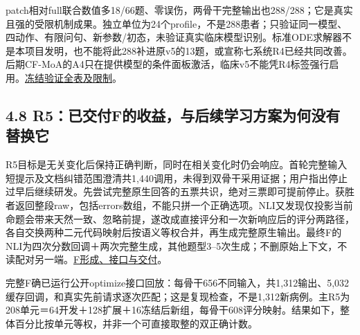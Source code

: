 \documentclass[
  11pt,
  a4paper,
]{article}
\begin{document}
patch相对full联合数值多18/66题、零误伤，两骨干完整输出也288/288；它是真实且强的受限机制成果。独立单位为24个profile，不是288患者；只验证同一模型、四动作、有限问句、新参数/初态，未验证真实临床模型识别。标准ODE求解器不是本项目发明，也不能将此288补进原v5的13题，或宣称七系统R4已经共同改善。后期CF-MoA的A4只在提供模型的条件面板激活，临床v5不能凭R4标签强行启用。\href{https://github.com/xiotakut/cf_mrg/blob/main/papers/2026-10-02_cf_moa/author_dossier/records/research/r4_consequence_head.md\#L579}{冻结验证全表及限制}。

\subsection{4.8
R5：已交付F的收益，与后续学习方案为何没有替换它}\label{r5ux5df2ux4ea4ux4ed8fux7684ux6536ux76caux4e0eux540eux7eedux5b66ux4e60ux65b9ux6848ux4e3aux4f55ux6ca1ux6709ux66ffux6362ux5b83}

R5目标是无关变化后保持正确判断，同时在相关变化时仍会响应。首轮完整输入短提示及文档纠错范围澄清共1,440调用，未得到双骨干采用证据；用户指出停止过早后继续研发。先尝试完整原生回答的五票共识，绝对三票即可提前停止。获胜者返回整段raw，包括errors数组，不能只拼一个正确选项。NLI又发现仅投影当前命题会带来天然一致、忽略前提，遂改成直接评分和一次新响应后的评分两路径，各自交换两种二元代码映射后按语义等权合并，再生成完整原生输出。最终F的NLI为四次分数回调＋两次完整生成，其他题型3--5次生成；不删原始上下文，不读配对另一端。\href{https://github.com/xiotakut/cf_mrg/blob/main/papers/2026-10-02_cf_moa/author_dossier/records/research/r5_invariance_head.md\#L198}{F形成、接口与交付}。

完整F确已运行公开optimize接口回放：每骨干656不同输入，共1,312输出、5,032缓存回调，和真实先前请求逐次匹配；这是复现检查，不是1,312新病例。主R5为208单元＝64开发＋128扩展＋16冻结后新组，每骨干608评分映射。结果如下，整体百分比按单元等权，并非一个可直接取整的双正确计数。
\end{document}
